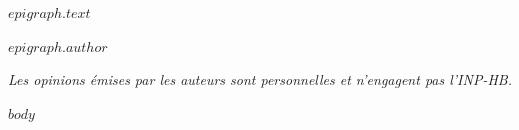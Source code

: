\documentclass[12pt,$if(lang)$$babel-lang$,$endif$$if(papersize)$$papersize$paper,$endif$$for(classoption)$$classoption$$sep$,$endfor$]{$documentclass$}
\begin{document}
\newpage
\vspace*{\fill}
\epigraph{$epigraph.text$}{\textit{$epigraph.author$}}
\vspace*{\fill}
\emph{Les opinions émises par les auteurs sont personnelles et n'engagent pas l'INP-HB.}
\newpage


$body$



\end{document}
